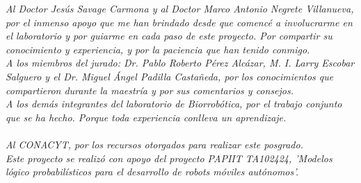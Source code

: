 \textit{Al Doctor Jesús Savage Carmona y al Doctor Marco Antonio Negrete Villanueva, por el inmenso apoyo que me han brindado desde que comencé a involucrarme en el laboratorio y por guiarme en cada paso de este proyecto. Por compartir su conocimiento y experiencia, y por la paciencia que han tenido conmigo.}\\

\textit{A los miembros del jurado: Dr. Pablo Roberto Pérez Alcázar, M. I. Larry Escobar Salguero y el Dr. Miguel Ángel Padilla Castañeda, por los conocimientos que compartieron durante la maestría y por sus comentarios y consejos.}\\

\textit{A los demás integrantes del laboratorio de Biorrobótica, por el trabajo conjunto que se ha hecho. Porque toda experiencia conlleva un aprendizaje.}\\

\phantom{holi}\\

\textit{Al CONACYT, por los recursos otorgados para realizar este posgrado.}\\

\textit{Este proyecto se realizó con apoyo del proyecto PAPIIT TA102424, 'Modelos lógico probabilísticos para el desarrollo de robots móviles autónomos'.}